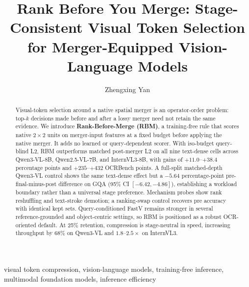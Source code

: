 \documentclass[journal]{IEEEtran}
\title{Rank Before You Merge: Stage-Consistent Visual Token Selection for
  Merger-Equipped Vision-Language Models}
\author{Zhengxing Yan}
\begin{document}
\maketitle

\begin{abstract}
Visual-token selection around a native spatial merger is an operator-order
problem: top-$k$ decisions made before and after a lossy merger need not retain
the same evidence. We introduce \textbf{Rank-Before-Merge (RBM)}, a training-free
rule that scores native $2\!\times\!2$ units on merger-input features at a
fixed budget before applying the native merger. It adds no learned or
query-dependent scorer. With iso-budget query-blind L2, RBM outperforms matched
post-merger L2 on all nine text-dense cells across Qwen3-VL-8B,
Qwen2.5-VL-7B, and InternVL3-8B, with gains of $+11.0$--$+38.4$ percentage
points and $+235$--$+432$ OCRBench points. A full-split matched-depth Qwen3-VL
control shows the same text-dense effect but a $-5.64$ percentage-point
pre-final-minus-post difference on GQA (95\% CI $[-6.42,-4.86]$), establishing
a workload boundary rather than a universal stage preference. Mechanism probes
show rank reshuffling and text-stroke demotion; a ranking-swap control recovers
pre accuracy with identical kept sets. Query-conditioned FastV remains stronger in several
reference-grounded and object-centric settings, so RBM is positioned as a
robust OCR-oriented default. At 25\% retention, compression is stage-neutral in
speed, increasing throughput by $68\%$ on Qwen3-VL and $1.8$--$2.5\times$ on
InternVL3.
\end{abstract}

\begin{IEEEkeywords}
visual token compression, vision-language models, training-free inference,
multimodal foundation models, inference efficiency
\end{IEEEkeywords}
\end{document}
